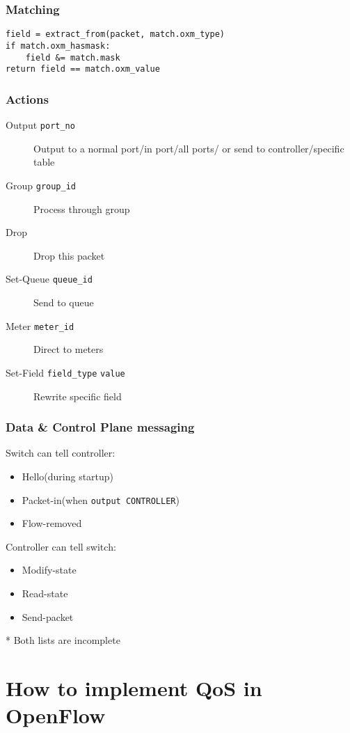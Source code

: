 \documentclass{beamer}
\begin{document}
\begin{frame}[fragile]
    \frametitle{Matching}
    \begin{verbatim}
field = extract_from(packet, match.oxm_type)
if match.oxm_hasmask:
    field &= match.mask
return field == match.oxm_value
    \end{verbatim}
\end{frame}

\begin{frame}[fragile]
\frametitle{Actions}
\begin{description}
    \item[Output \texttt{port\_no}] Output to a normal port/in port/all ports/ or send to controller/specific table
    \item[Group \texttt{group\_id}] Process through group
    \item[Drop \texttt{}] Drop this packet
    \item[Set-Queue \texttt{queue\_id}] Send to queue
    \item[Meter \texttt{meter\_id}] Direct to meters
    \item[Set-Field \texttt{field\_type} \texttt{value}] Rewrite specific field
\end{description}
\end{frame}

\begin{frame}
\frametitle{Data \& Control Plane messaging}
Switch can tell controller:
\begin{itemize}
    \item Hello(during startup)
    \item Packet-in(when \texttt{output CONTROLLER})
    \item Flow-removed
\end{itemize}

Controller can tell switch:
\begin{itemize}
    \item Modify-state
    \item Read-state
    \item Send-packet
\end{itemize}

\begin{small}
    * Both lists are incomplete
\end{small}

\end{frame}

\section{How to implement QoS in OpenFlow}
\end{document}
